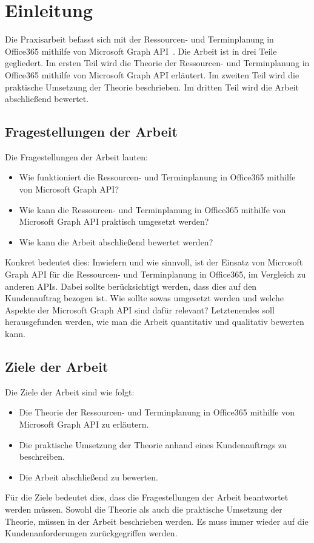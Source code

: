 


\section{Einleitung}\label{sec:einleitung}
Die Praxisarbeit befasst sich mit der Ressourcen- und Terminplanung in Office365 mithilfe von Microsoft Graph API~\cite{microsoftGraphApi}.
Die Arbeit ist in drei Teile gegliedert.
Im ersten Teil wird die Theorie der Ressourcen- und Terminplanung in Office365 mithilfe von Microsoft Graph API erläutert.
Im zweiten Teil wird die praktische Umsetzung der Theorie beschrieben.
Im dritten Teil wird die Arbeit abschließend bewertet.
    \newline
    \subsection{Fragestellungen der Arbeit}\label{subsec:fragestellungen-der-arbeit}
Die Fragestellungen der Arbeit lauten:
    \begin{itemize}
        \item Wie funktioniert die Ressourcen- und Terminplanung in Office365 mithilfe von Microsoft Graph API?
        \item Wie kann die Ressourcen- und Terminplanung in Office365 mithilfe von Microsoft Graph API praktisch umgesetzt werden?
        \item Wie kann die Arbeit abschließend bewertet werden?
    \end{itemize}
Konkret bedeutet dies:
\newline
Inwiefern und wie sinnvoll, ist der Einsatz von Microsoft Graph API für die Ressourcen- und Terminplanung in Office365, im Vergleich zu anderen APIs.
Dabei sollte berücksichtigt werden, dass dies auf den Kundenauftrag bezogen ist.
Wie sollte sowas umgesetzt werden und welche Aspekte der Microsoft Graph API sind dafür relevant?
Letztenendes soll herausgefunden werden, wie man die Arbeit quantitativ und qualitativ bewerten kann.
    \subsection{Ziele der Arbeit}\label{subsec:ziele-der-arbeit}
Die Ziele der Arbeit sind wie folgt:
    \begin{itemize}
        \item Die Theorie der Ressourcen- und Terminplanung in Office365 mithilfe von Microsoft Graph API zu erläutern.
        \item Die praktische Umsetzung der Theorie anhand eines Kundenauftrags zu beschreiben.
        \item Die Arbeit abschließend zu bewerten.
    \end{itemize}
Für die Ziele bedeutet dies, dass die Fragestellungen der Arbeit beantwortet werden müssen.
Sowohl die Theorie als auch die praktische Umsetzung der Theorie, müssen in der Arbeit beschrieben werden.
Es muss immer wieder auf die Kundenanforderungen zurückgegriffen werden.

